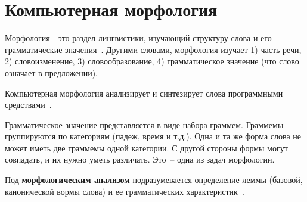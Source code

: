 \section{Компьютерная морфология} \label{sect_review_comp_morphology}

Морфология - это раздел лингвистики, изучающий структуру слова и его грамматические значения~\cite{MitreninaNikolaevLando2016}. Другими словами, морфология изучает
1) часть речи,
2) словоизменение,
3) словообразование,
4) грамматическое значение (что слово означает в предложении). 

Компьютерная морфология анализирует и синтезирует слова программными средствами~\cite{MitreninaNikolaevLando2016}. 

Грамматическое значение представляется в виде набора граммем. Граммемы группируются по категориям (падеж, время и т.д.). Одна и та же форма слова не может иметь две граммемы одной категории. С другой стороны формы могут совпадать, и их нужно уметь различать. Это~-- одна из задач морфологии.


Под \textbf{морфологическим анализом} подразумевается определение леммы (базовой, канонической вормы слова) и ее грамматических характеристик~\cite{MitreninaNikolaevLando2016}.
